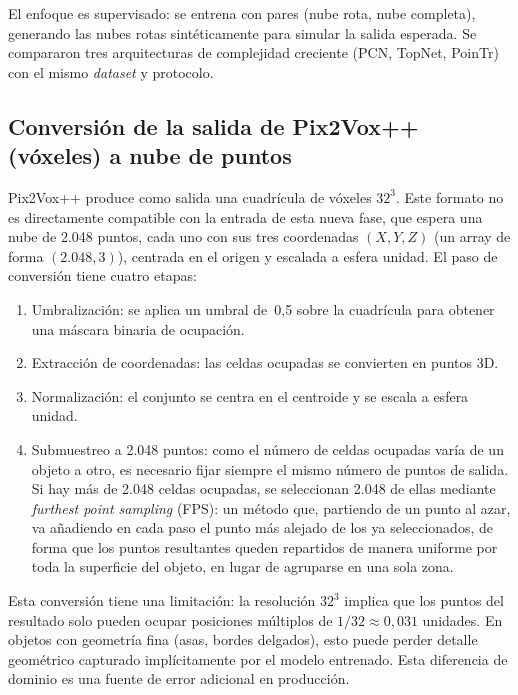 \documentclass[10pt,a4paper]{report}
\begin{document}
El enfoque es supervisado: se entrena con pares (nube rota, nube completa), generando
las nubes rotas sintéticamente para simular la salida esperada.
Se compararon tres arquitecturas de complejidad creciente (PCN, TopNet, PoinTr) con el
mismo \textit{dataset} y protocolo.

\subsection{Conversión de la salida de Pix2Vox++ (vóxeles) a nube de puntos}
\label{subsec:interfaz_e2_e3}

Pix2Vox++ produce como salida una cuadrícula de vóxeles $32^3$.
Este formato no es directamente compatible con la entrada de esta nueva fase, que espera
una nube de 2.048 puntos, cada uno con sus tres coordenadas $(X, Y, Z)$ (un array de forma $(2{.}048, 3)$), centrada en el origen y escalada a esfera unidad.
El paso de conversión tiene cuatro etapas:
\begin{enumerate}
  \item Umbralización: se aplica un umbral de~0,5 sobre la cuadrícula para
        obtener una máscara binaria de ocupación.
  \item Extracción de coordenadas: las celdas ocupadas se convierten en
        puntos 3D.
  \item Normalización: el conjunto se centra en el centroide y se escala a
        esfera unidad.
  \item Submuestreo a 2.048 puntos: como el número de celdas ocupadas varía
        de un objeto a otro, es necesario fijar siempre el mismo número de
        puntos de salida. Si hay más de 2.048 celdas ocupadas, se seleccionan
        2.048 de ellas mediante \textit{furthest point sampling} (FPS): un
        método que, partiendo de un punto al azar, va añadiendo en cada paso
        el punto más alejado de los ya seleccionados, de forma que los puntos
        resultantes queden repartidos de manera uniforme por toda la
        superficie del objeto, en lugar de agruparse en una sola zona.
\end{enumerate}

Esta conversión tiene una limitación: la resolución $32^3$ implica que los puntos del
resultado solo pueden ocupar posiciones múltiplos de $1/32\approx 0{,}031$ unidades.
En objetos con geometría fina (asas, bordes delgados), esto puede perder detalle
geométrico capturado implícitamente por el modelo entrenado.
Esta diferencia de dominio es una fuente de error adicional en producción.
\end{document}
